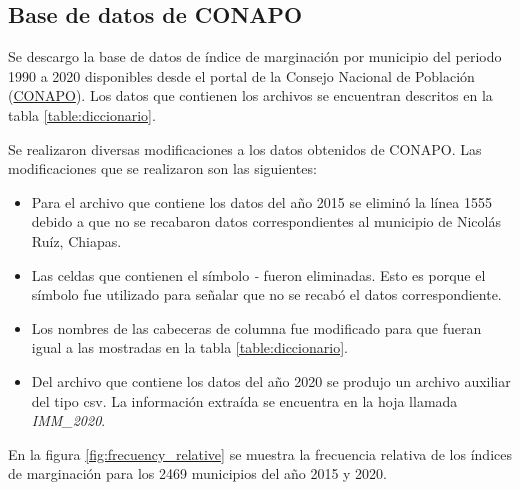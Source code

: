 \subsection{Base de datos de CONAPO}

Se descargo la base de datos de índice de marginación por municipio del periodo 1990 a 2020 disponibles desde el portal de la Consejo Nacional de Población (\href{https://datos.gob.mx/busca/dataset/indice-de-marginacion-carencias-poblacionales-por-localidad-municipio-y-entidad}{CONAPO})\cite{data_2015,data_2020}. Los datos que contienen los archivos se encuentran descritos en la tabla \ref{table:diccionario}.



Se realizaron diversas modificaciones a los datos obtenidos de CONAPO. Las modificaciones que se realizaron son las siguientes:

\begin{itemize}
	\item  	Para el archivo que contiene los datos del año 2015 se eliminó la línea 1555 debido a que no se recabaron datos correspondientes al municipio de Nicolás Ruíz, Chiapas.
	\item Las celdas que contienen el símbolo \textit{-} fueron eliminadas. Esto es porque el símbolo fue utilizado para señalar que no se recabó el datos correspondiente.
	\item Los nombres de las cabeceras de columna fue modificado para que fueran igual a las mostradas en la tabla \ref*{table:diccionario}.
	\item Del archivo que contiene los datos del año 2020 se produjo un archivo auxiliar del tipo csv. La información extraída se encuentra en la hoja llamada \textit{IMM\_2020}.
\end{itemize}

En la figura \ref{fig:frecuency_relative} se muestra la frecuencia relativa de los índices de marginación para los 2469 municipios del año 2015 y 2020.

